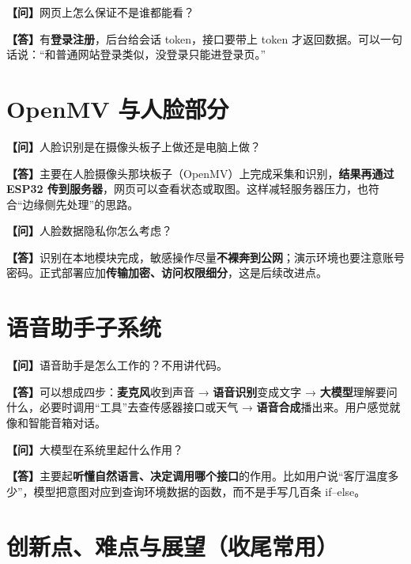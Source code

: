 \documentclass[11pt,a4paper]{ctexart}
\newcommand{\答辩问}[1]{\par\noindent\textbf{\color{QColor}【问】}#1\par\vspace{0.35em}}
\newcommand{\答辩答}[1]{\noindent\textbf{【答】}#1\par}
\begin{document}
\begin{qabox}
\答辩问{网页上怎么保证不是谁都能看？}
\答辩答{有\textbf{登录注册}，后台给会话 token，接口要带上 token 才返回数据。可以一句话说：``和普通网站登录类似，没登录只能进登录页。''}
\end{qabox}

\section{OpenMV 与人脸部分}

\begin{qabox}
\答辩问{人脸识别是在摄像头板子上做还是电脑上做？}
\答辩答{主要在人脸摄像头那块板子（OpenMV）上完成采集和识别，\textbf{结果再通过 ESP32 传到服务器}，网页可以查看状态或取图。这样减轻服务器压力，也符合``边缘侧先处理''的思路。}
\end{qabox}

\begin{qabox}
\答辩问{人脸数据隐私你怎么考虑？}
\答辩答{识别在本地模块完成，敏感操作尽量\textbf{不裸奔到公网}；演示环境也要注意账号密码。正式部署应加\textbf{传输加密、访问权限细分}，这是后续改进点。}
\end{qabox}

\section{语音助手子系统}

\begin{qabox}
\答辩问{语音助手是怎么工作的？不用讲代码。}
\答辩答{可以想成四步：\textbf{麦克风}收到声音 → \textbf{语音识别}变成文字 → \textbf{大模型}理解要问什么，必要时调用``工具''去查传感器接口或天气 → \textbf{语音合成}播出来。用户感觉就像和智能音箱对话。}
\end{qabox}

\begin{qabox}
\答辩问{大模型在系统里起什么作用？}
\答辩答{主要起\textbf{听懂自然语言、决定调用哪个接口}的作用。比如用户说``客厅温度多少''，模型把意图对应到查询环境数据的函数，而不是手写几百条 if--else。}
\end{qabox}

\section{创新点、难点与展望（收尾常用）}
\end{document}

